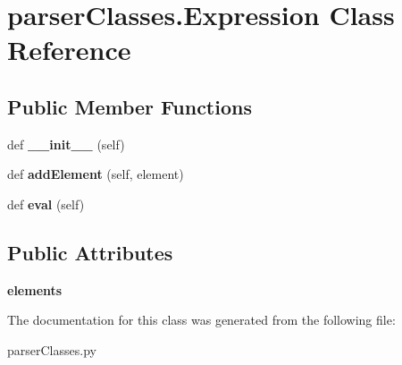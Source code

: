 \hypertarget{classparser_classes_1_1_expression}{}\section{parser\+Classes.\+Expression Class Reference}
\label{classparser_classes_1_1_expression}
\subsection*{Public Member Functions}
\begin{DoxyCompactItemize}
\item 
\mbox{\label{classparser_classes_1_1_expression_ae01f3aaff0913d71e84dd96fb520541c}} 
def {\bfseries \+\_\+\+\_\+init\+\_\+\+\_\+} (self)
\item 
\mbox{\label{classparser_classes_1_1_expression_a0065ec38485063fce29c52fcd4fa0156}} 
def {\bfseries add\+Element} (self, element)
\item 
\mbox{\label{classparser_classes_1_1_expression_a9eb95e98f5d2ac1c133830abf80dae82}} 
def {\bfseries eval} (self)
\end{DoxyCompactItemize}
\subsection*{Public Attributes}
\begin{DoxyCompactItemize}
\item 
\mbox{\label{classparser_classes_1_1_expression_a68033b9f9c015d5507c42206c801e324}} 
{\bfseries elements}
\end{DoxyCompactItemize}


The documentation for this class was generated from the following file\+:\begin{DoxyCompactItemize}
\item 
parser\+Classes.\+py\end{DoxyCompactItemize}
